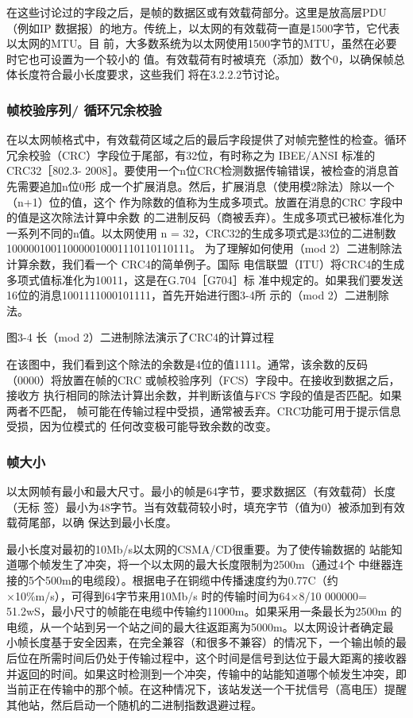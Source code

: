 在这些讨论过的字段之后，是帧的数据区或有效载荷部分。这里是放高层PDU（例如IP
数据报）的地方。传统上，以太网的有效载荷一直是1500字节，它代表以太网的MTU。目
前，大多数系统为以太网使用1500字节的MTU，虽然在必要时它也可设置为一个较小的
值。有效载荷有时被填充（添加）数个0，以确保帧总体长度符合最小长度要求，这些我们
将在3.2.2.2节讨论。

\subsubsection{帧校验序列/ 循环冗余校验}

在以太网帧格式中，有效载荷区域之后的最后字段提供了对帧完整性的检查。循环
冗余校验（CRC）字段位于尾部，有32位，有时称之为 IBEE/ANSI 标准的CRC32［802.3-
2008］。要使用一个n位CRC检测数据传输错误，被检查的消息首先需要追加n位0形
成一个扩展消息。然后，扩展消息（使用模2除法）除以一个（n+1）位的值，这个
作为除数的值称为生成多项式。放置在消息的CRC 字段中的值是这次除法计算中余数
的二进制反码（商被丢弃）。生成多项式已被标准化为一系列不同的n值。以太网使用
n = 32，CRC32的生成多项式是33位的二进制数100000100110000010001110110110111。
为了理解如何使用（mod 2）二进制除法计算余数，我们看一个 CRC4的简单例子。国际
电信联盟（ITU）将CRC4的生成多项式值标准化为10011，这是在G.704［G704］标
准中规定的。如果我们要发送16位的消息1001111000101111，首先开始进行图3-4所
示的（mod 2）二进制除法。

图3-4 长（mod 2）二进制除法演示了CRC4的计算过程

在该图中，我们看到这个除法的余数是4位的值1111。通常，该余数的反码
（0000）将放置在帧的CRC 或帧校验序列（FCS）字段中。在接收到数据之后，接收方
执行相同的除法计算出余数，并判断该值与FCS 字段的值是否匹配。如果两者不匹配，
帧可能在传输过程中受损，通常被丢弃。CRC功能可用于提示信息受损，因为位模式的
任何改变极可能导致余数的改变。

\subsubsection{帧大小}

以太网帧有最小和最大尺寸。最小的帧是64字节，要求数据区（有效载荷）长度（无标
签）最小为48字节。当有效载荷较小时，填充字节（值为0）被添加到有效载荷尾部，以确
保达到最小长度。

\begin{tcolorbox}
    最小长度对最初的10Mb/s以太网的CSMA/CD很重要。为了使传输数据的
    站能知道哪个帧发生了冲突，将一个以太网的最大长度限制为2500m（通过4个
    中继器连接的5个500m的电缆段）。根据电子在铜缆中传播速度约为0.77C（约
    ×10\%m/s），可得到64字节来用10Mb/s 时的传输时间为64×8/10 000000=
    51.2wS，最小尺寸的帧能在电缆中传输约11000m。如果采用一条最长为2500m
    的电缆，从一个站到另一个站之间的最大往返距离为5000m。以太网设计者确定最
    小帧长度基于安全因素，在完全兼容（和很多不兼容）的情况下，一个输出帧的最
    后位在所需时间后仍处于传输过程中，这个时间是信号到达位于最大距离的接收器
    并返回的时间。如果这时检测到一个冲突，传输中的站能知道哪个帧发生冲突，即
    当前正在传输中的那个帧。在这种情况下，该站发送一个干扰信号（高电压）提醒
    其他站，然后启动一个随机的二进制指数退避过程。
\end{tcolorbox}


